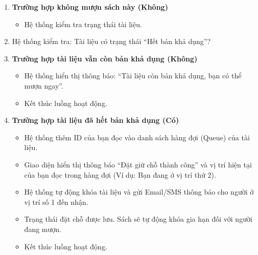 \begin{enumerate}
    \item \textbf{Trường hợp không mượn sách này (Không)}
    \begin{itemize}
        \item Hệ thống kiểm tra trạng thái tài liệu.
    \end{itemize}

    \item Hệ thống kiểm tra: Tài liệu có trạng thái ``Hết bản khả dụng''?

    \item \textbf{Trường hợp tài liệu vẫn còn bản khả dụng (Không)}
    \begin{itemize}
        \item Hệ thống hiển thị thông báo: ``Tài liệu còn bản khả dụng, bạn có thể mượn ngay''.
        \item Kết thúc luồng hoạt động.
    \end{itemize}

    \item \textbf{Trường hợp tài liệu đã hết bản khả dụng (Có)}
    \begin{itemize}
        \item Hệ thống thêm ID của bạn đọc vào danh sách hàng đợi (Queue) của tài liệu.
        \item Giao diện hiển thị thông báo ``Đặt giữ chỗ thành công'' và vị trí hiện tại của bạn đọc trong hàng đợi (Ví dụ: Bạn đang ở vị trí thứ 2).
        \item Hệ thống tự động khóa tài liệu và gửi Email/SMS thông báo cho người ở vị trí số 1 đến nhận.
        \item Trạng thái đặt chỗ được lưu. Sách sẽ tự động khóa gia hạn đối với người đang mượn.
        \item Kết thúc luồng hoạt động.
    \end{itemize}

    
\end{enumerate}

